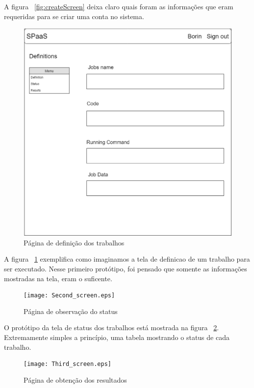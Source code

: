 \documentclass[11pt,twoside]{article}
\begin{document}
A figura ~\ref{fig:createScreen} deixa claro quais foram as informações que eram requeridas para se criar uma conta no sistema. 

\begin{figure}[h!]
  \centering
  \includegraphics[scale=0.2]{First_screen.eps}
  \caption{Página de definição dos trabalhos}
  \label{fig:definitionScreen}
\end{figure}


A figura ~\ref{fig:definitionScreen} exemplifica como imaginamos a tela de definicao de um trabalho para ser executado. Nesse primeiro protótipo, foi pensado que somente 
as informações mostradas na tela, eram o suficente.

\begin{figure}[h!]
  \centering
  \texttt{[image: Second\_screen.eps]}
  \caption{Página de observação do status}
  \label{fig:statusScreen}
\end{figure}


O protótipo da tela de status dos trabalhos está mostrada na figura ~\ref{fig:statusScreen}. Extremamente simples a princípio, uma tabela mostrando o status de cada trabalho. 

\begin{figure}[h!]
  \centering
  \texttt{[image: Third\_screen.eps]}
  \caption{Página de obtenção dos resultados}
  \label{fig:resultsScreen}
\end{figure}
\end{document}
